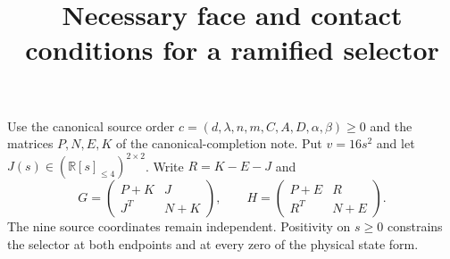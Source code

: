 \documentclass[11pt]{article}
\title{Necessary face and contact conditions for a ramified selector}
\author{}\date{}
\newcommand{\R}{\mathbb R}
\begin{document}
\maketitle\vspace{-2em}
Use the canonical source order
$c=(d,\lambda,n,m,C,A,D,\alpha,\beta)\ge0$ and the matrices $P,N,E,K$
of the canonical-completion note. Put $v=16s^2$ and let
$J(s)\in(\R[s]_{\le4})^{2\times2}$. Write $R=K-E-J$ and
\[
 G=\begin{pmatrix}P+K&J\\J^T&N+K\end{pmatrix},\qquad
 H=\begin{pmatrix}P+E&R\\R^T&N+E\end{pmatrix}.
\]
The nine source coordinates remain independent. Positivity on $s\ge0$
constrains the selector at both endpoints and at every zero of the
physical state form.
\end{document}
